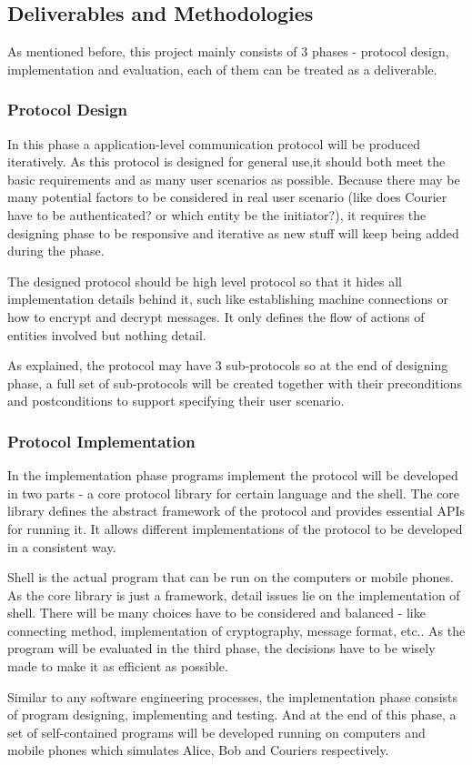 \documentclass[11pt,a4paper]{article}
\begin{document}
\subsection{Deliverables and Methodologies}
As mentioned before, this project mainly consists of 3 phases - protocol design, implementation and evaluation, each of them can be treated as a deliverable.

\subsubsection{Protocol Design}
In this phase a application-level communication protocol will be produced iteratively. As this protocol is designed for general use,it should both meet the basic requirements and as many user scenarios as possible. Because there may be many potential factors to be considered in real user scenario (like does Courier have to be authenticated? or which entity be the initiator?), it requires the designing phase to be responsive and iterative as new stuff will keep being added during the phase.\par
The designed protocol should be high level protocol so that it hides all implementation details behind it, such like establishing machine connections or how to encrypt and decrypt messages. It only defines the flow of actions of entities involved but nothing detail.\par
As explained, the protocol may have 3 sub-protocols so at the end of designing phase, a full set of sub-protocols will be created together with their preconditions and postconditions to support specifying their user scenario.\par

\subsubsection{Protocol Implementation}
In the implementation phase programs implement the protocol will be developed in two parts - a core protocol library for certain language and the shell. The core library defines the abstract framework of the protocol and provides essential APIs for running it. It allows different implementations of the protocol to be developed in a consistent way.\par 
Shell is the actual program that can be run on the computers or mobile phones. As the core library is just a framework, detail issues lie on the implementation of shell. There will be many choices have to be considered and balanced - like connecting method, implementation of cryptography, message format, etc.. As the program will be evaluated in the third phase, the decisions have to be wisely made to make it as efficient as possible.\par 
Similar to any software engineering processes, the implementation phase consists of program designing, implementing and testing. And at the end of this phase, a set of self-contained programs will be developed running on computers and mobile phones which simulates Alice, Bob and Couriers respectively.
\end{document}
